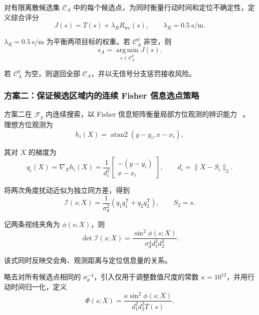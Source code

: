 对有限离散候选集 $\mathcal C_A$ 中的每个候选点，为同时衡量行动时间和定位不确定性，定义综合评分
\begin{equation}
  J(s)=T(s)+\lambda_RR_{\mathrm{wc}}(s),
  \qquad \lambda_R=0.5\ \mathrm{s/m}.
  \label{eq:q2-discrete-score}
\end{equation}

$\lambda_R=0.5\ \mathrm{s/m}$ 为平衡两项目标的权重。若 $\mathcal C_A^g$ 非空，则
\begin{equation}
  s_A=\operatorname*{arg\,min}_{s\in
  \mathcal C_A^g}J(s).
  \label{eq:q2-baseline-choice}
\end{equation}

若 $\mathcal C_A^g$ 为空，则退回全部 $\mathcal C_A$，并以无信号分支惩罚接收风险。

\subsubsection{方案二：保证候选区域内的连续 Fisher 信息选点策略}

方案二在 $\widehat{\mathcal F}_g$ 内连续搜索，以 Fisher 信息矩阵衡量局部方位观测的辨识能力
~\cite{fisher1922}。理想方位观测为
\begin{equation}
  h_i(X)=\operatorname{atan2}(y-y_i,x-x_i),
\end{equation}

其对 $X$ 的梯度为
\begin{equation}
  q_i(X)=\nabla_X h_i(X)
  =\frac{1}{d_i^2}
  \begin{bmatrix}
    -(y-y_i)\\ x-x_i
  \end{bmatrix},
  \qquad d_i=\|X-S_i\|_2.
\end{equation}

将两次角度扰动近似为独立同方差，得到
\begin{equation}
  \mathcal I(s;X)
  =\frac{1}{\sigma_\theta^2}
  \left(q_1q_1^{\mathsf T}+q_2q_2^{\mathsf T}\right),
  \qquad S_2=s.
  \label{eq:q2-fim}
\end{equation}

记两条视线夹角为 $\phi(s;X)$，则
\begin{equation}
  \det\mathcal I(s;X)
  =\frac{\sin^2\phi(s;X)}
  {\sigma_\theta^4d_1^2d_2^2}.
  \label{eq:q2-fim-determinant}
\end{equation}

该式同时反映交会角、观测距离与定位信息量的关系。

略去对所有候选点相同的 $\sigma_\theta^{-4}$，引入仅用于调整数值尺度的常数 $\kappa=10^{12}$，并用行动时间归一化，定义
\begin{equation}
  \Phi(s;X)=
  \frac{\kappa\sin^2\phi(s;X)}
  {d_1^2d_2^2T(s)}.
\end{equation}

